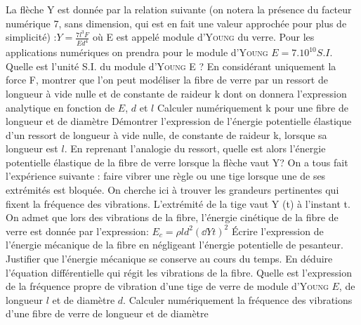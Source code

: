 \begin{Exercise}[title=($*$) Fibre de verre]
\begin{center}
  \end{center}
  La flèche Y est donnée par la relation suivante (on notera la présence du
  facteur numérique 7, sans dimension, qui est en fait une valeur approchée pour
  plus de simplicité) :$Y=\frac{7l^3F}{Ed^4}$ où E est appelé module d’\textsc{Young} du
  verre. Pour les applications numériques on prendra pour le module d’\textsc{Young}
  $E = 7.10^{10} S.I.$
  \Question Quelle est l’unité S.I. du module d’\textsc{Young} E ?
  \Question En considérant uniquement la force F, montrer que l’on peut
  modéliser la fibre de verre par un ressort de longueur à vide nulle et de
  constante de raideur k dont on donnera l’expression analytique en fonction de
  $E$, $d$ et $l$
  \Question Calculer numériquement k pour une fibre de longueur
   et de diamètre 
  \Question Démontrer l’expression de l’énergie potentielle élastique d’un ressort de longueur à
  vide nulle, de constante de raideur k, lorsque sa longueur est $l$. En
  reprenant l’analogie du ressort, quelle est alors l’énergie potentielle
  élastique de la fibre de verre lorsque la flèche vaut Y?
  \Question On a tous fait l’expérience suivante : faire vibrer une règle ou une tige lorsque une de
  ses extrémités est bloquée. On cherche ici à trouver les grandeurs pertinentes
  qui fixent la fréquence des vibrations. L’extrémité de la tige vaut Y (t) à
  l’instant t. On admet que lors des vibrations de la fibre, l’énergie cinétique
  de la fibre de verre est donnée par l’expression:
  $E_c = \rho l d^2 \left(\dd{Y}{t}\right)^2$
  \Question Écrire l’expression de l’énergie mécanique de la fibre en négligeant
  l’énergie potentielle de pesanteur.
  \Question Justifier que l’énergie mécanique se conserve au cours du
  temps. En déduire l’équation différentielle qui régit les vibrations de la
  fibre.
  \Question Quelle est l’expression de la fréquence propre de vibration
  d’une tige de verre de module d’\textsc{Young} $E$, de longueur $l$ et de diamètre $d$.
  \Question Calculer numériquement la fréquence des vibrations d’une fibre de
  verre de longueur  et de diamètre 
\end{Exercise}
